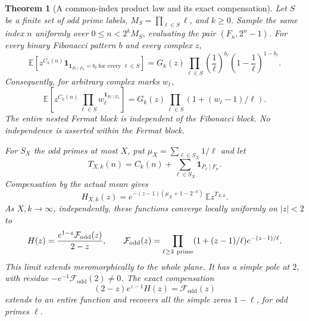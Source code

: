 \documentclass[11pt]{article}
\newtheorem{theorem}{Theorem}[section]
\theoremstyle{definition}
\begin{document}
\begin{theorem}[A common-index product law and its exact compensation]
\label{thm:fermat-fibonacci-profile}
Let $S$ be a finite set of odd prime labels,
$M_S=\prod_{\ell\in S}\ell$, and $k\ge0$.
Sample the same index $n$ uniformly over
$0\le n<2^kM_S$, evaluating the pair $(F_n,2^n-1)$.
For every binary Fibonacci pattern $b$ and every complex $z$,
\[
 \mathbb E\!\left[
 z^{C_k(n)}
 \boldsymbol{1}_{
   \boldsymbol{1}_{P_\ell\mid F_n}=b_\ell\ \text{for every }\ell\in S}\right]
 =
 G_k(z)\prod_{\ell\in S}
 \left(\frac1\ell\right)^{b_\ell}
 \left(1-\frac1\ell\right)^{1-b_\ell}.
\]
Consequently, for arbitrary complex marks $w_\ell$,
\[
 \mathbb E\!\left[
 z^{C_k(n)}
 \prod_{\ell\in S}w_\ell^{\boldsymbol{1}_{P_\ell\mid F_n}}\right]
 =G_k(z)\prod_{\ell\in S}(1+(w_\ell-1)/\ell).
\]
The entire nested Fermat block is independent of the Fibonacci
block. No independence is asserted within the Fermat block.

For $S_X$ the odd primes at most $X$, put
$\mu_X=\sum_{\ell\in S_X}1/\ell$ and let
\[
 T_{X,k}(n)=C_k(n)+
   \sum_{\ell\in S_X}\boldsymbol{1}_{P_\ell\mid F_n}.
\]
Compensation by the \emph{actual mean} gives
\[
 H_{X,k}(z)
 =e^{-(z-1)(\mu_X+1-2^{-k})}\,
   \mathbb E z^{T_{X,k}}.
\]
As $X,k\to\infty$, independently, these functions converge
locally uniformly on $|z|<2$ to
\[
 H(z)=\frac{e^{1-z}\mathcal F_{\mathrm{odd}}(z)}{2-z},
 \qquad
 \mathcal F_{\mathrm{odd}}(z)=
 \prod_{\ell\ge3\ {\rm prime}}
   (1+(z-1)/\ell)e^{-(z-1)/\ell}.
\]
This limit extends meromorphically to the whole plane.
It has a simple pole at $2$, with residue
$-e^{-1}\mathcal F_{\mathrm{odd}}(2)\ne0$.
The exact compensation
\[
 (2-z)e^{z-1}H(z)=\mathcal F_{\mathrm{odd}}(z)
 \label{eq:fermat-fibonacci-pole-removal}
\]
extends to an entire function and recovers all the simple zeros
$1-\ell$, for odd primes $\ell$.
\end{theorem}
\end{document}
